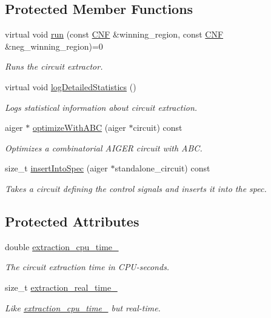 \subsection*{Protected Member Functions}
\begin{DoxyCompactItemize}
\item 
virtual void \hyperlink{classCNFImplExtractor_a8251ce58869f9f8ded159f1fa07ab334}{run} (const \hyperlink{classCNF}{C\-N\-F} \&winning\-\_\-region, const \hyperlink{classCNF}{C\-N\-F} \&neg\-\_\-winning\-\_\-region)=0
\begin{DoxyCompactList}\small\item\em Runs the circuit extractor. \end{DoxyCompactList}\item 
virtual void \hyperlink{classCNFImplExtractor_abe790c767f6c71a52ef8b0a61ab39eaa}{log\-Detailed\-Statistics} ()
\begin{DoxyCompactList}\small\item\em Logs statistical information about circuit extraction. \end{DoxyCompactList}\item 
aiger $\ast$ \hyperlink{classCNFImplExtractor_a58a4e5021d0ef9c4190a5be74fb5a83e}{optimize\-With\-A\-B\-C} (aiger $\ast$circuit) const 
\begin{DoxyCompactList}\small\item\em Optimizes a combinatorial A\-I\-G\-E\-R circuit with A\-B\-C. \end{DoxyCompactList}\item 
size\-\_\-t \hyperlink{classCNFImplExtractor_a0970602635f3356712d57ebb28d12c0d}{insert\-Into\-Spec} (aiger $\ast$standalone\-\_\-circuit) const 
\begin{DoxyCompactList}\small\item\em Takes a circuit defining the control signals and inserts it into the spec. \end{DoxyCompactList}\end{DoxyCompactItemize}
\subsection*{Protected Attributes}
\begin{DoxyCompactItemize}
\item 
double \hyperlink{classCNFImplExtractor_ab8be06d42fd3c4b569ec22cfcf2f508e}{extraction\-\_\-cpu\-\_\-time\-\_\-}
\begin{DoxyCompactList}\small\item\em The circuit extraction time in C\-P\-U-\/seconds. \end{DoxyCompactList}\item 
size\-\_\-t \hyperlink{classCNFImplExtractor_ae06413cf08f868357d64545b3041aa18}{extraction\-\_\-real\-\_\-time\-\_\-}
\begin{DoxyCompactList}\small\item\em Like \hyperlink{classCNFImplExtractor_ab8be06d42fd3c4b569ec22cfcf2f508e}{extraction\-\_\-cpu\-\_\-time\-\_\-} but real-\/time. \end{DoxyCompactList}\end{DoxyCompactItemize}
